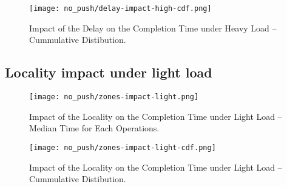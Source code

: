 \begin{figure}[H]
  \vspace{-10pt}
  \centering
  \centerline{\texttt{[image: no\_push/delay-impact-high-cdf.png]}}
  \vspace{-5pt}
  \caption{Impact of the Delay on the Completion Time under Heavy Load – Cummulative Distibution.}
  \vspace{-5pt}
  \label{fig:delay-impact-high-cdf}
\end{figure}

\subsection{Locality impact under light load}
\begin{figure}[H]
  \vspace{-10pt}
  \centering
  \centerline{\texttt{[image: no\_push/zones-impact-light.png]}}
  \vspace{-5pt}
  \caption{Impact of the Locality on the Completion Time under Light Load – Median Time for Each Operations.}
  \vspace{-5pt}
  \label{fig:zones-impact-light}
\end{figure}

\begin{figure}[H]
  \vspace{-10pt}
  \centering
  \centerline{\texttt{[image: no\_push/zones-impact-light-cdf.png]}}
  \vspace{-5pt}
  \caption{Impact of the Locality on the Completion Time under Light Load – Cummulative Distibution.}
  \vspace{-5pt}
  \label{fig:zones-impact-light-cdf}
\end{figure}

